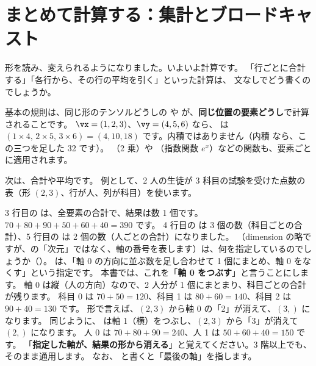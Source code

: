 \section{まとめて計算する：集計とブロードキャスト}\label{sec:pt-broadcast}

形を読み、変えられるようになりました。いよいよ計算です。
「行ごとに合計する」「各行から、その行の平均を引く」といった計算は、 文なしでどう書くのでしょうか。

基本の規則は、同じ形のテンソルどうしの \code{+} や \code{*} が、\textbf{同じ位置の要素どうし}で計算されることです。
$\vx=(1,2,3)$、$\vy=(4,5,6)$ なら、 は $(1\times 4,\,2\times 5,\,3\times 6)=(4,10,18)$ です。内積ではありません（内積  なら、この三つを足した 32 です）。
（2 乗）や （指数関数 $e^{x}$）などの関数も、要素ごとに適用されます。

次は、合計や平均です。
例として、2 人の生徒が 3 科目の試験を受けた点数の表（形 $(2,3)$、行が人、列が科目）を使います。



3 行目の  は、全要素の合計で、結果は数 1 個です。$70+80+90+50+60+40=390$ です。
4 行目の  は 3 個の数（科目ごとの合計）、5 行目の  は 2 個の数（人ごとの合計）になりました。
（dimension の略ですが、の「次元」ではなく、軸の番号を表します）は、何を指定しているのでしょうか（）。
 は、「軸 0 の方向に並ぶ数を足し合わせて 1 個にまとめ、軸 0 をなくす」という指定です。
本書では、これを「\textbf{軸 0 をつぶす}」と言うことにします。
軸 0 は縦（人の方向）なので、2 人分が 1 個にまとまり、科目ごとの合計が残ります。
科目 0 は $70+50=120$、科目 1 は $80+60=140$、科目 2 は $90+40=130$ です。
形で言えば、$(2,3)$ から軸 0 の「2」が消えて、$(3,)$ になります。
同じように、 は軸 1（横）をつぶし、$(2,3)$ から「3」が消えて $(2,)$ になります。
人 0 は $70+80+90=240$、人 1 は $50+60+40=150$ です。
「\textbf{指定した軸が、結果の形から消える}」と覚えてください。3 階以上でも、そのまま通用します。
なお、 と書くと「最後の軸」を指します。

